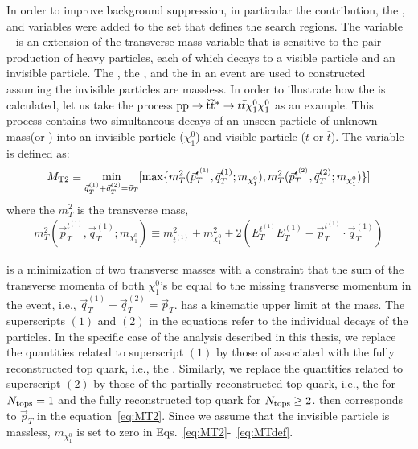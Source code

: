 In order to improve background suppression, in particular the \ttbar
contribution, the \MET, \HT and \MTTwo variables were added to the 
set that defines the search regions. The variable 
\MTTwo~\cite{Lester:1999tx,Barr:2003rg} is an extension of the transverse 
mass variable that is sensitive to the pair production of heavy particles, each
of which decays to a visible particle and an invisible particle.
The \pTop, the \pRsystem, and the \MET in an event
are used to constructed \MTTwo assuming the invisible particles are massless.
In order to illustrate how the \MTTwo is calculated, let us take the process 
${\rm pp} \rightarrow \tilde{{\mathrm t}}\tilde{{\mathrm t}}^\ast\rightarrow t\bar{t}\chi_1^0\chi_1^0$
as an example. This process contains two simultaneous decays of an unseen 
particle of unknown mass(\sTop or \santiTop) into an invisible 
particle ($\chi_1^0$) and visible particle ($t$ or $\bar{t}$). The
variable \MTTwo is defined as:
\begin{equation} \label{eq:MT2}
   \begin{array}{l}
     \displaystyle{ \MTTwo \equiv \min_{\vec{q}_{T}^{(1)}+\vec{q}_{T}^{(2)} = \vec{p}_{T}} [\max\{m_{T}^2(\vec{p}_{T}^{t^{(1)}}, \vec{q}_{T}^{(1)}; m_{\chi_1^0}), m_{T}^2(\vec{p}_{T}^{t^{(2)}}, \vec{q}_{T}^{(2)}; m_{\chi_1^0})\}]  } 
   \end{array}
\end{equation}
where the $m_{T}^2$ is the transverse mass,
\begin{equation} \label{eq:MTdef}
   \begin{array}{l}
     \displaystyle{
        m_{T}^2(\vec{p}_{T}^{t^{(1)}}, \vec{q}_{T}^{(1)}; m_{\chi_1^0}) \equiv m_{t^{(1)}}^{2} + m_{\chi_1^0}^2 + 2(E_{T}^{t^{(1)}}E_{T}^{(1)} - \vec{p}_{T}^{t^{(1)}} \cdot \vec{q}_{T}^{(1)})
     }
   \end{array}
\end{equation} 

\MTTwo is a minimization of two transverse masses with a constraint that 
the sum of the transverse momenta of both $\chi_1^0$'s be equal to the 
missing transverse momentum in the event, i.e., $\vec{q}_{T}^{(1)}+\vec{q}_{T}^{(2)} = \vec{p}_{T}$. 
\MTTwo has a kinematic upper limit at the \sTop mass. 
The superscripts $(1)$ and $(2)$ in the equations refer to the individual 
decays of the \sTop particles. In the specific case of the analysis described
in this thesis, we replace the quantities related to superscript $(1)$ by those
of associated with the fully reconstructed top quark, i.e., the \pTop. 
Similarly, we replace the quantities related to superscript $(2)$ by those
of the partially reconstructed top quark, i.e., the \pRsystem 
for $N_{\text{tops}} =1$ and the fully reconstructed top quark for $N_{\text{tops}} \ge 2$. 
\MET then corresponds to $\vec{p}_{T}$ in the equation~\ref{eq:MT2}. 
Since we assume that the invisible particle is massless, $m_{\chi_1^0}$ is set to zero in Eqs.~\ref{eq:MT2}-~\ref{eq:MTdef}. 

